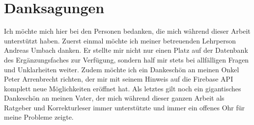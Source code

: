 \documentclass[../main.tex]{subfiles}
\begin{document}
\section*{Danksagungen}
Ich möchte mich hier bei den Personen bedanken, die mich während dieser Arbeit unterstützt haben. Zuerst einmal möchte ich meiner betreuenden Lehrperson Andreas Umbach danken. Er stellte mir nicht nur einen Platz auf der Datenbank des Ergänzungsfaches zur Verfügung, sondern half mir stets bei allfälligen Fragen und Unklarheiten weiter. Zudem möchte ich ein Dankeschön an  meinen Onkel Peter Arrenbrecht richten, der mir mit seinem Hinweis auf die Firebase API komplett neue Möglichkeiten eröffnet hat. Als letztes gilt noch ein gigantisches Dankeschön an meinen Vater, der mich während dieser ganzen Arbeit als Ratgeber und Korrekturleser immer unterstützte und immer ein offenes Ohr für meine Probleme zeigte.
\end{document}
